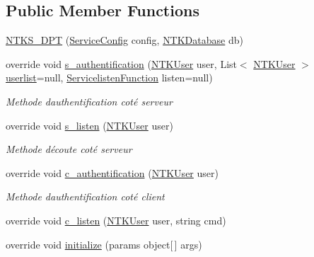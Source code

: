 \subsection*{Public Member Functions}
\begin{DoxyCompactItemize}
\item 
\mbox{\hyperlink{class_n_t_k_1_1_service_1_1_n_t_k_s___d_p_t_aefe28d6efd35548763e8dfd30fa33623}{N\+T\+K\+S\+\_\+\+D\+PT}} (\mbox{\hyperlink{struct_n_t_k_1_1_service_1_1_service_config}{Service\+Config}} config, \mbox{\hyperlink{class_n_t_k_1_1_database_1_1_n_t_k_database}{N\+T\+K\+Database}} db)
\item 
override void \mbox{\hyperlink{class_n_t_k_1_1_service_1_1_n_t_k_s___d_p_t_ac4329c0824028ac2ccb9020cb52aa0f6}{s\+\_\+authentification}} (\mbox{\hyperlink{class_n_t_k_1_1_n_t_k_user}{N\+T\+K\+User}} user, List$<$ \mbox{\hyperlink{class_n_t_k_1_1_n_t_k_user}{N\+T\+K\+User}} $>$ \mbox{\hyperlink{class_n_t_k_1_1_service_1_1_n_t_k_service_a14977c798a805fea99802fa40da31aa0}{userlist}}=null, \mbox{\hyperlink{namespace_n_t_k_1_1_service_a49f4581ae6fb3e9c155d034c47791db9}{Servicelisten\+Function}} listen=null)
\begin{DoxyCompactList}\small\item\em Methode d\textquotesingle{}authentification coté serveur \end{DoxyCompactList}\item 
override void \mbox{\hyperlink{class_n_t_k_1_1_service_1_1_n_t_k_s___d_p_t_a6472459b1a28f1d257e61242bc812639}{s\+\_\+listen}} (\mbox{\hyperlink{class_n_t_k_1_1_n_t_k_user}{N\+T\+K\+User}} user)
\begin{DoxyCompactList}\small\item\em Methode d\textquotesingle{}écoute coté serveur \end{DoxyCompactList}\item 
override void \mbox{\hyperlink{class_n_t_k_1_1_service_1_1_n_t_k_s___d_p_t_a6ebeaaab18026e60204f922c8f3780cb}{c\+\_\+authentification}} (\mbox{\hyperlink{class_n_t_k_1_1_n_t_k_user}{N\+T\+K\+User}} user)
\begin{DoxyCompactList}\small\item\em Methode d\textquotesingle{}authentification coté client \end{DoxyCompactList}\item 
override void \mbox{\hyperlink{class_n_t_k_1_1_service_1_1_n_t_k_s___d_p_t_ae37a659d2cf01cd5bb8ab1ca5ccdb7a2}{c\+\_\+listen}} (\mbox{\hyperlink{class_n_t_k_1_1_n_t_k_user}{N\+T\+K\+User}} user, string cmd)
\item 
override void \mbox{\hyperlink{class_n_t_k_1_1_service_1_1_n_t_k_s___d_p_t_af34ae802a92ae0ddd7192da7306717e4}{initialize}} (params object\mbox{[}$\,$\mbox{]} args)
\end{DoxyCompactItemize}
